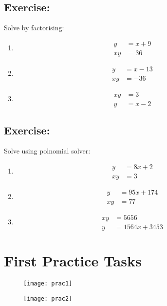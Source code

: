 \documentclass[a4paper,11pt]{article}
\begin{document}
\subsection{Exercise:}\label{ex4}
Solve by factorising:
\begin{multicols}{3}
\begin{enumerate}
\item \begin{align*}
y&=x+9\\
xy&=36
\end{align*}
\item \begin{align*}
y&=x-13\\
xy&=-36
\end{align*}
\item \begin{align*}
xy&=3\\
y&=x-2
\end{align*}
\end{enumerate}	
\end{multicols}
\subsection{Exercise:}\label{ex5}
Solve using polnomial solver:
\begin{multicols}{3}
\begin{enumerate}
\item \begin{align*}
y&=8x+2\\
xy&=3
\end{align*}
\item \begin{align*}
y&=95x+174\\
xy&=77
\end{align*}
\item \begin{align*}
xy&=5656\\
y&=1564x+3453
\end{align*}
\end{enumerate}	
\end{multicols}



\newpage
\section{First Practice Tasks}
\begin{figure}[!ht]
	\centering
	\texttt{[image: prac1]}
\end{figure}
\newpage
\begin{figure}[!ht]
	\centering
	\texttt{[image: prac2]}
\end{figure}
\newpage
\end{document}
